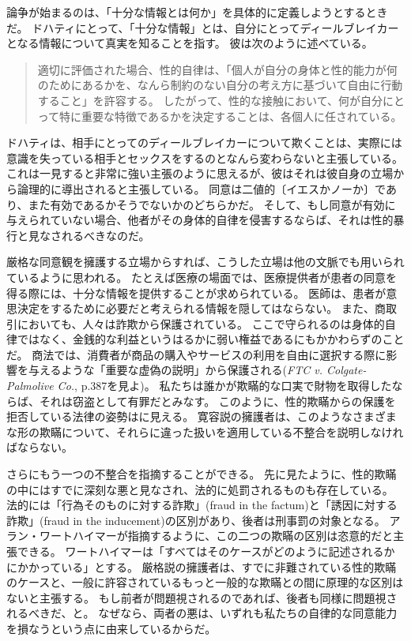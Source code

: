 \documentclass[paper=a4,book,openany]{jlreq} \usepackage{mystyle}
\begin{document}
論争が始まるのは、「十分な情報とは何か」を具体的に定義しようとするときだ。
ドハティにとって、「十分な情報」とは、自分にとってディールブレイカーとなる情報について真実を知ることを指す。
彼は次のように述べている。

\begin{quote}
適切に評価された場合、性的自律は、「個人が自分の身体と性的能力が何のためにあるかを、なんら制約のない自分の考え方に基づいて自由に行動すること」\citep[p.70]{schulhofer92:_takin_sexual_auton_serious}を許容する。
したがって、性的な接触において、何が自分にとって特に重要な特徴であるかを決定することは、各個人に任されている。
\citep[p.730]{dougherty13:_sex_lies_consen}

\end{quote}

ドハティは、相手にとってのディールブレイカーについて欺くことは、実際には意識を失っている相手とセックスをするのとなんら変わらないと主張している。
これは一見すると非常に強い主張のように思えるが、彼はそれは彼自身の立場から論理的に導出されると主張している。
同意は二値的〔イエスかノーか〕であり、また有効であるかそうでないかのどちらかだ。
そして、もし同意が有効に与えられていない場合、他者がその身体的自律を侵害するならば、それは性的暴行と見なされるべきなのだ。

厳格な同意観を擁護する立場からすれば、こうした立場は他の文脈でも用いられているように思われる。
たとえば医療の場面では、医療提供者が患者の同意を得る際には、十分な情報を提供することが求められている。
医師は、患者が意思決定をするために必要だと考えられる情報を隠してはならない。
また、商取引においても、人々は詐欺から保護されている。
ここで守られるのは身体的自律ではなく、金銭的な利益というはるかに弱い権益であるにもかかわらずのことだ。
商法では、消費者が商品の購入やサービスの利用を自由に選択する際に影響を与えるような「重要な虚偽の説明」から保護される(\emph{FTC v. Colgate-Palmolive Co.}, p.387を見よ)。
私たちは誰かが欺瞞的な口実で財物を取得したならば、それは窃盗として有罪だとみなす。
このように、性的欺瞞からの保護を拒否している法律の姿勢はに見える\citep[][pp.69--71を見よ]{estrich87:_real_rape}。
寛容説の擁護者は、このようなさまざまな形の欺瞞について、それらに違った扱いを適用している不整合を説明しなければならない。

さらにもう一つの不整合を指摘することができる。
先に見たように、性的欺瞞の中にはすでに深刻な悪と見なされ、法的に処罰されるものも存在している。
法的には「行為そのものに対する詐欺」(fraud in the factum)と「誘因に対する詐欺」(fraud in the inducement)の区別があり、後者は刑事罰の対象となる。
アラン・ワートハイマーが指摘するように、この二つの欺瞞の区別は恣意的だと主張できる。
ワートハイマーは「すべてはそのケースがどのように記述されるかにかかっている」とする\citep[p.206]{wertheimer03:_consen_sexual_relat}。
厳格説の擁護者は、すでに非難されている性的欺瞞のケースと、一般に許容されているもっと一般的な欺瞞との間に原理的な区別はないと主張する。
もし前者が問題視されるのであれば、後者も同様に問題視されるべきだ、と。
なぜなら、両者の悪は、いずれも私たちの自律的な同意能力を損なうという点に由来しているからだ。
\end{document}
